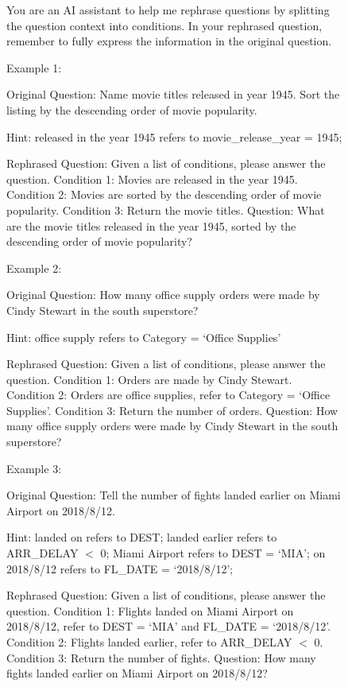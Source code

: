 \begin{figure}[h!]
    \centering
    \begin{tcolorbox}[
        title=Rephrase Question Action Prompt,
        colback=white,        %
        colframe=blue!75!black,  %
        fonttitle=\bfseries,    %
    ]

You are an AI assistant to help me rephrase questions by splitting the question context into conditions. In your rephrased question, remember to fully express the information in the original question.
\vspace{1em}

Example 1:

Original Question: Name movie titles released in year 1945. Sort the listing by the descending order of movie popularity.

Hint: released in the year 1945 refers to movie\_release\_year = 1945;

Rephrased Question: Given a list of conditions, please answer the question. Condition 1: Movies are released in the year 1945. Condition 2: Movies are sorted by the descending order of movie popularity. Condition 3: Return the movie titles. Question: What are the movie titles released in the year 1945, sorted by the descending order of movie popularity?
\vspace{1em}

Example 2:

Original Question: How many office supply orders were made by Cindy Stewart in the south superstore?

Hint: office supply refers to Category = `Office Supplies'

Rephrased Question: Given a list of conditions, please answer the question. Condition 1: Orders are made by Cindy Stewart. Condition 2: Orders are office supplies, refer to Category = `Office Supplies'. Condition 3: Return the number of orders. Question: How many office supply orders were made by Cindy Stewart in the south superstore?
\vspace{1em}

Example 3:

Original Question: Tell the number of fights landed earlier on Miami Airport on 2018/8/12.

Hint: landed on refers to DEST; landed earlier refers to ARR\_DELAY $<$ 0; Miami Airport refers to DEST = `MIA'; on 2018/8/12 refers to FL\_DATE = `2018/8/12';

Rephrased Question: Given a list of conditions, please answer the question. Condition 1: Flights landed on Miami Airport on 2018/8/12, refer to DEST = `MIA' and FL\_DATE = `2018/8/12'. Condition 2: Flights landed earlier, refer to ARR\_DELAY $<$ 0. Condition 3: Return the number of fights. Question: How many fights landed earlier on Miami Airport on 2018/8/12?
\vspace{1em}


\end{tcolorbox}
\end{figure}
